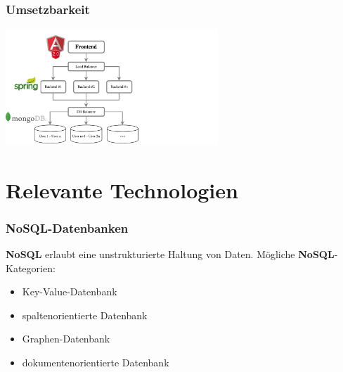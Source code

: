 \documentclass{beamer} %
\begin{document}
\begin{frame}
\frametitle{Umsetzbarkeit}
\begin{center}
\includegraphics[trim = 0mm 0mm 0mm 0mm, clip, width=0.60\textwidth]{img/frameworks}
\end{center}
\end{frame}



%
%
%
%






\section{Relevante Technologien}
\begin{frame}
\frametitle{NoSQL-Datenbanken}
\textbf{NoSQL} erlaubt eine unstrukturierte Haltung von Daten.\newline\newline
Mögliche \textbf{NoSQL}-Kategorien:

\begin{itemize}

\item Key-Value-Datenbank
\item spaltenorientierte Datenbank
\item Graphen-Datenbank
\item dokumentenorientierte Datenbank

\end{itemize}
\end{frame}
\end{document}

